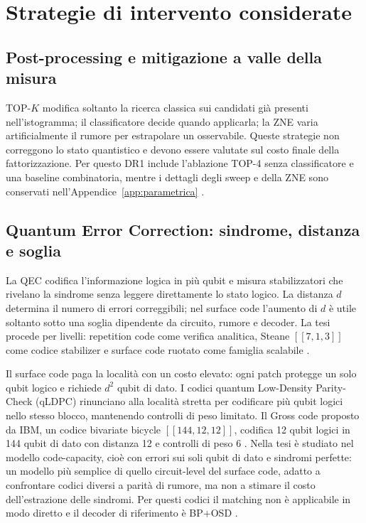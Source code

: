 \section{Strategie di intervento considerate}\label{sec:finale_3_4}

\subsection{Post-processing e mitigazione a valle della misura}\label{sec:finale_3_4_1}

TOP-$K$ modifica soltanto la ricerca classica sui candidati già presenti nell'istogramma; il classificatore decide quando applicarla; la ZNE varia artificialmente il rumore per estrapolare un osservabile. Queste strategie non correggono lo stato quantistico e devono essere valutate sul costo finale della fattorizzazione. Per questo DR1 include l'ablazione TOP-4 senza classificatore e una baseline combinatoria, mentre i dettagli degli sweep e della ZNE sono conservati nell'Appendice~\ref{app:parametrica} \cite{temme2017,liBenjamin2017}.

\subsection{Quantum Error Correction: sindrome, distanza e soglia}\label{sec:finale_3_4_2}

La QEC codifica l'informazione logica in più qubit e misura stabilizzatori che rivelano la sindrome senza leggere direttamente lo stato logico. La distanza $d$ determina il numero di errori correggibili; nel surface code l'aumento di $d$ è utile soltanto sotto una soglia dipendente da circuito, rumore e decoder. La tesi procede per livelli: repetition code come verifica analitica, Steane $[[7,1,3]]$ come codice stabilizer e surface code ruotato come famiglia scalabile \cite{shorcorrection1995,steane1996,fowler2012,dennis2002topological,googleQECBelowThreshold2025}.

Il surface code paga la località con un costo elevato: ogni patch protegge un solo qubit logico e richiede $d^2$ qubit di dato. I codici quantum Low-Density Parity-Check (qLDPC) rinunciano alla località stretta per codificare più qubit logici nello stesso blocco, mantenendo controlli di peso limitato. Il Gross code proposto da IBM, un codice bivariate bicycle $[[144,12,12]]$, codifica 12 qubit logici in 144 qubit di dato con distanza 12 e controlli di peso 6 \cite{bravyi2024}. Nella tesi è studiato nel modello code-capacity, cioè con errori sui soli qubit di dato e sindromi perfette: un modello più semplice di quello circuit-level del surface code, adatto a confrontare codici diversi a parità di rumore, ma non a stimare il costo dell'estrazione delle sindromi. Per questi codici il matching non è applicabile in modo diretto e il decoder di riferimento è BP+OSD \cite{roffe2020,panteleev2021}.

